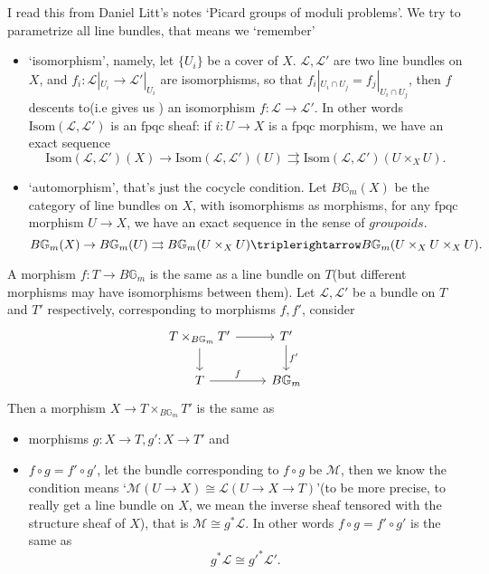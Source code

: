 \documentclass[main.tex]{subfiles}
\begin{document}
\begin{example}
I read this from Daniel Litt's notes `Picard groups of moduli problems'. We try to parametrize all line bundles, that means we `remember'
\begin{itemize}
\item `isomorphism', namely, let $\{U_{i}\}$ be a cover of $X$. $\mathcal{L},\mathcal{L}'$ are two line bundles on $X$, and $f_{i}: \mathcal{L}|_{U_{i}}\rightarrow \mathcal{L}'|_{U_{i}}$ are isomorphisms, so that $f_{i}|_{U_{i}\cap U_{j}}=f_{j}|_{U_{i}\cap U_{j}}$, then $f$ descents to(i.e gives us ) an isomorphism $f:\mathcal{L}\rightarrow \mathcal{L}'$. In other words $\mathrm{Isom}(\mathcal{L},\mathcal{L}')$ is an $\mathrm{fpqc}$ sheaf: if $i: U\rightarrow X$ is a $\mathrm{fpqc}$ morphism, we have an exact sequence
$$\mathrm{Isom}(\mathcal{L},\mathcal{L}')(X)\rightarrow \mathrm{Isom}(\mathcal{L},\mathcal{L}')(U)\rightrightarrows \mathrm{Isom}(\mathcal{L},\mathcal{L}')(U\times_{X}U).$$
\item `automorphism', that's just the cocycle condition. Let $B\mathbb{G}_{m}(X)$ be the category of line bundles on $X$, with isomorphisms as morphisms, for any $\mathrm{fpqc}$ morphism $U\rightarrow X$, we have an exact sequence in the sense of $groupoids.$
$$B\mathbb{G}_{m}(X)\rightarrow B\mathbb{G}_{m}(U)\rightrightarrows B\mathbb{G}_{m}(U\times_{X}U)\triplerightarrow B\mathbb{G}_{m}(U\times_{X}U\times_{X}U).$$ 
\end{itemize}


A morphism $f: T\rightarrow B\mathbb{G}_{m}$ is the same as a line bundle on $T$(but different morphisms may have isomorphisms between them). Let $\mathcal{L}, \mathcal{L}'$ be a bundle on $T$ and $T'$ respectively, corresponding to morphisms $f,f'$, consider   
$$\begin{tikzcd}
T\times_{B\mathbb{G}_{m}}T'\arrow{r}\arrow{d} & T'\arrow{d}{f'}\\
T\arrow{r}{f}& B\mathbb{G}_{m}\end{tikzcd}$$
Then a morphism $X\rightarrow T\times_{B\mathbb{G}_{m}}T'$ is the same as 
\begin{itemize}
\item morphisms $g: X\rightarrow T, g': X\rightarrow T'$ and
\item $f\circ g=f'\circ g'$, let the bundle corresponding to $f\circ g$ be $\mathcal{M}$, then we know the condition means `$\mathcal{M}(U\rightarrow X)\cong \mathcal{L}(U\rightarrow X\rightarrow T)$'(to be more precise, to really get a line bundle on $X$, we mean the inverse sheaf tensored with the structure sheaf of $X$), that is $\mathcal{M}\cong g^{*}\mathcal{L}$. In other words $f\circ g=f'\circ g'$ is the same as 
$$g^{*}\mathcal{L}\cong g'^{*}\mathcal{L}'.$$
\end{itemize}



\end{example}
\end{document}
